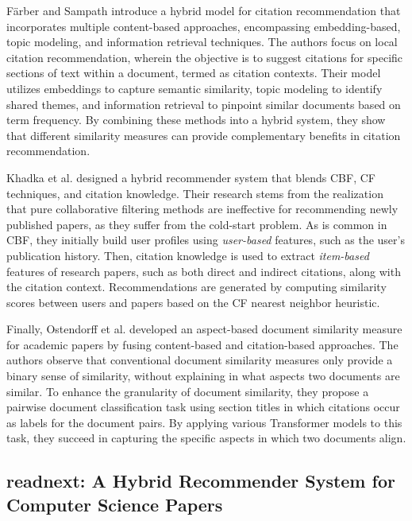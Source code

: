 Färber and Sampath \cite{FarberHybridCiteHybrid2020} introduce a hybrid model for citation recommendation that incorporates multiple content-based approaches, encompassing embedding-based, topic modeling, and information retrieval techniques.
The authors focus on local citation recommendation, wherein the objective is to suggest citations for specific sections of text within a document, termed as citation contexts.
Their model utilizes embeddings to capture semantic similarity, topic modeling to identify shared themes, and information retrieval to pinpoint similar documents based on term frequency. By combining these methods into a hybrid system, they show that different similarity measures can provide complementary benefits in citation recommendation.

Khadka et al. \cite{KhadkaCapturingExploiting2020} designed a hybrid recommender system that blends \ac{CBF}, \ac{CF} techniques, and citation knowledge.
Their research stems from the realization that pure collaborative filtering methods are ineffective for recommending newly published papers, as they suffer from the cold-start problem.
As is common in \ac{CBF}, they initially build user profiles using \emph{user-based} features, such as the user's publication history. Then, citation knowledge is used to extract \emph{item-based} features of research papers, such as both direct and indirect citations, along with the citation context.
Recommendations are generated by computing similarity scores between users and papers based on the \ac{CF} nearest neighbor heuristic.

Finally, Ostendorff et al. \cite{OstendorffAspectbasedDocument2020} developed an aspect-based document similarity measure for academic papers by fusing content-based and citation-based approaches.
The authors observe that conventional document similarity measures only provide a binary sense of similarity, without explaining in what aspects two documents are similar.
To enhance the granularity of document similarity, they propose a pairwise document classification task using section titles in which citations occur as labels for the document pairs.
By applying various Transformer models to this task, they succeed in capturing the specific aspects in which two documents align.


\subsection{readnext: A Hybrid Recommender System for Computer Science Papers}

